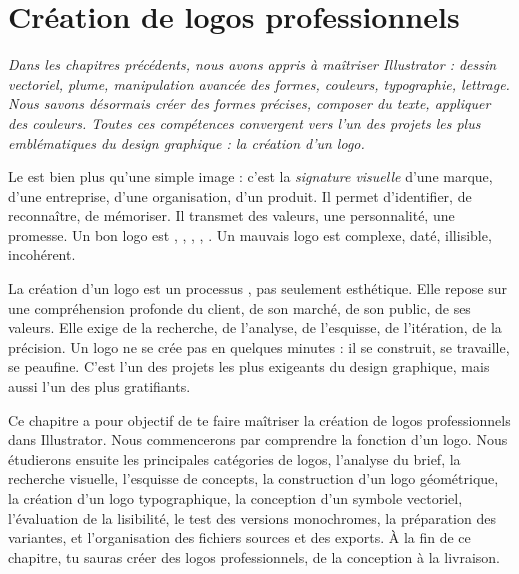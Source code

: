 
\chapter{Création de logos professionnels}

\noindent
\textit{Dans les chapitres précédents, nous avons appris à maîtriser Illustrator : dessin vectoriel, plume, manipulation avancée des formes, couleurs, typographie, lettrage. Nous savons désormais créer des formes précises, composer du texte, appliquer des couleurs. Toutes ces compétences convergent vers l'un des projets les plus emblématiques du design graphique : la création d'un logo.}

\vspace{1em}

\noindent
Le  est bien plus qu'une simple image : c'est la \emph{signature visuelle} d'une marque, d'une entreprise, d'une organisation, d'un produit. Il permet d'identifier, de reconnaître, de mémoriser. Il transmet des valeurs, une personnalité, une promesse. Un bon logo est , , , , . Un mauvais logo est complexe, daté, illisible, incohérent.

\vspace{1em}

\noindent
La création d'un logo est un processus , pas seulement esthétique. Elle repose sur une compréhension profonde du client, de son marché, de son public, de ses valeurs. Elle exige de la recherche, de l'analyse, de l'esquisse, de l'itération, de la précision. Un logo ne se crée pas en quelques minutes : il se construit, se travaille, se peaufine. C'est l'un des projets les plus exigeants du design graphique, mais aussi l'un des plus gratifiants.

\vspace{1em}

\noindent
Ce chapitre a pour objectif de te faire maîtriser la création de logos professionnels dans Illustrator. Nous commencerons par comprendre la fonction d'un logo. Nous étudierons ensuite les principales catégories de logos, l'analyse du brief, la recherche visuelle, l'esquisse de concepts, la construction d'un logo géométrique, la création d'un logo typographique, la conception d'un symbole vectoriel, l'évaluation de la lisibilité, le test des versions monochromes, la préparation des variantes, et l'organisation des fichiers sources et des exports. À la fin de ce chapitre, tu sauras créer des logos professionnels, de la conception à la livraison.

